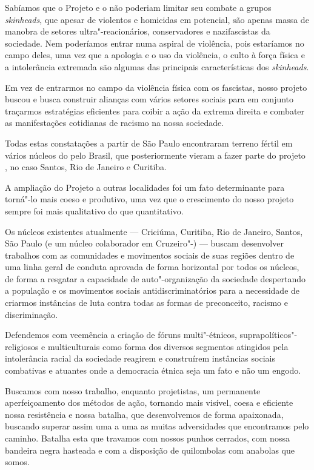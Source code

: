 Sabíamos que o Projeto  e o  não poderiam limitar seu combate a grupos \emph{skinheads}, que apesar de violentos e homicidas em potencial, são apenas massa de manobra de setores ultra"-reacionários, conservadores e nazifascistas da sociedade. Nem poderíamos entrar numa aspiral de violência, pois estaríamos no campo deles, uma vez que a apologia e o uso da violência, o culto à força física e a intolerância extremada são algumas das principais características dos \emph{skinheads}.

Em vez de entrarmos no campo da violência física com os fascistas, nosso projeto buscou e busca construir alianças com vários setores sociais para em conjunto traçarmos estratégias eficientes para coibir a ação da extrema direita e combater as manifestações cotidianas de racismo na nossa sociedade.

Todas estas constatações a partir de São Paulo encontraram terreno fértil em vários núcleos do  pelo Brasil, que posteriormente vieram a fazer parte do projeto , no caso Santos, Rio de Janeiro e Curitiba.

A ampliação do Projeto  a outras localidades foi um fato determinante para torná"-lo mais coeso e produtivo, uma vez que o crescimento do nosso projeto sempre foi mais qualitativo do que quantitativo.

Os núcleos existentes atualmente --- Criciúma, Curitiba, Rio de Janeiro, Santos, São Paulo (e um núcleo colaborador em Cruzeiro"-) --- buscam desenvolver trabalhos com as comunidades e movimentos sociais de suas regiões dentro de uma linha geral de conduta aprovada de forma horizontal por todos os núcleos, de forma a resgatar a capacidade de auto"-organização da sociedade despertando a população e os movimentos sociais antidiscriminatórios para a necessidade de criarmos instâncias de luta contra todas as formas de preconceito, racismo e discriminação.

Defendemos com veemência a criação de fóruns multi"-étnicos, suprapolíticos"-religiosos e multiculturais como forma dos diversos segmentos atingidos pela intolerância racial da sociedade reagirem e construírem instâncias sociais combativas e atuantes onde a democracia étnica seja um fato e não um engodo.

Buscamos com nosso trabalho, enquanto projetistas, um permanente aperfeiçoamento dos métodos de ação, tornando mais visível, coesa e eficiente nossa resistência e nossa batalha, que desenvolvemos de forma apaixonada, buscando superar assim uma a uma as muitas adversidades que encontramos pelo caminho.
Batalha esta que travamos com nossos punhos cerrados, com nossa bandeira negra hasteada e com a disposição de quilombolas com anabolas que somos.\enlargethispage{\baselineskip}

